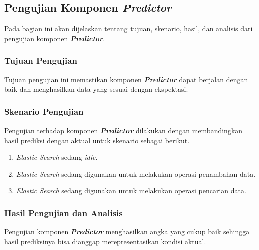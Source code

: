 \subsection{Pengujian Komponen \textit{Predictor}}

Pada bagian ini akan dijelaskan tentang tujuan, skenario, hasil, dan analisis dari pengujian komponen \textbf{\textit{Predictor}}.

\subsubsection{Tujuan Pengujian}

Tujuan pengujian ini memastikan komponen \textbf{\textit{Predictor}} dapat berjalan dengan baik dan menghasilkan data yang sesuai dengan ekspektasi.

\subsubsection{Skenario Pengujian}

Pengujian terhadap komponen \textbf{\textit{Predictor}} dilakukan dengan membandingkan hasil prediksi dengan aktual untuk skenario sebagai berikut.
\begin{enumerate}
    \item \textit{Elastic Search} sedang \textit{idle}.
    \item \textit{Elastic Search} sedang digunakan untuk melakukan operasi penambahan data.
    \item \textit{Elastic Search} sedang digunakan untuk melakukan operasi pencarian data.
\end{enumerate}

\subsubsection{Hasil Pengujian dan Analisis}


Pengujian komponen \textbf{\textit{Predictor}} menghasilkan angka yang cukup baik sehingga hasil prediksinya bisa dianggap merepresentasikan kondisi aktual.